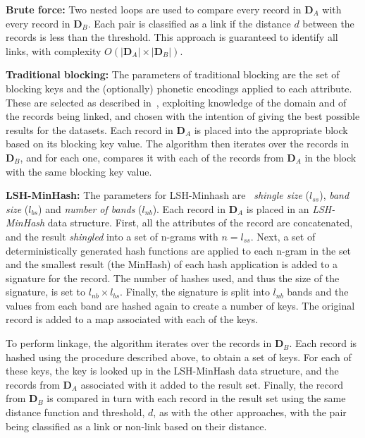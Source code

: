 \documentclass{llncs}
\begin{document}
\smallskip
\textbf{Brute force:}
Two nested loops are used to compare every record in
$\mathbf{D}_A$ with every record in $\mathbf{D}_B$. Each pair is
classified as a link if the distance $d$ between the records is less
than the threshold. This approach is guaranteed to identify all links,
with complexity $ O(|\mathbf{D}_A| \times |\mathbf{D}_B|) $.

\smallskip
\textbf{Traditional blocking:}
The parameters of traditional blocking are the set of blocking keys
and the (optionally) phonetic
encodings applied to each attribute. These are selected as described
in~\cite{Chr12b}, exploiting knowledge of the domain and of the
records being linked, and chosen with the intention of giving the
best possible results for the datasets. Each record in $\mathbf{D}_A$
is placed into the appropriate block based on its blocking key value.
The algorithm then iterates over the records in $\mathbf{D}_B$, and
for each one, compares it with each of the records from $\mathbf{D}_A$
in the block with the same blocking key value.

\smallskip
\textbf{LSH-MinHash:}
The parameters for LSH-Minhash are~\cite{Broder1997} \emph{shingle
size} ($l_{ss}$), \emph{band size} ($l_{bs}$) and \emph{number of
bands} ($l_{nb}$). Each record in $\mathbf{D}_A$ is placed in an
\emph{LSH-MinHash} data structure. First, all the attributes of the
record are concatenated, and the result \emph{shingled} into a set of
n-grams with $n = l_{ss}$. Next, a set of deterministically generated
hash functions are applied to each n-gram in the set and the smallest
result (the MinHash) of each hash application is added to a signature
for the record. The number of hashes used, and thus the size of the
signature, is set to $l_{nb} \times l_{bs}$. Finally, the signature is
split into $l_{nb}$ bands and the values from each band are hashed
again to create a number of keys. The original record is added to a
map associated with each of the keys. 

To perform linkage, the algorithm iterates over the records in
$\mathbf{D}_B$. Each record is hashed using the procedure described
above, to obtain a set of keys. For each of these keys, the key is
looked up in the LSH-MinHash data structure, and the records from
$\mathbf{D}_A$ associated with it added to the result set. Finally,
the record from $\mathbf{D}_B$ is compared in turn with each record
in the result set using the same distance function and threshold, $d$,
as with the other approaches, with the pair being classified as a link
or non-link based on their distance.
\end{document}
